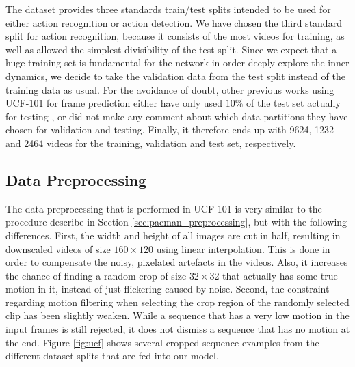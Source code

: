 The dataset provides three standards train/test splits intended to be used for either action recognition or action detection. We have chosen the third standard split for action recognition, because it consists of the most videos for training, as well as allowed the simplest divisibility of the test split. Since we expect that a huge training set is fundamental for the network in order deeply explore the inner dynamics, we decide to take the validation data from the test split instead of the training data as usual. For the avoidance of doubt, other previous works using UCF-101 for frame prediction either have only used $ 10\% $ of the test set actually for testing \parencite[p. 12]{deep_multiscale_video_pred}, or did not make any comment about which data partitions they have chosen for validation and testing. Finally, it therefore ends up with \num{9624}, \num{1232} and \num{2464} videos for the training, validation and test set, respectively.


\subsection{Data Preprocessing}

The data preprocessing that is performed in UCF-101 is very similar to the procedure describe in Section \ref{sec:pacman_preprocessing}, but with the following differences. First, the width and height of all images are cut in half, resulting in downscaled videos of size $160 \times 120$ using linear interpolation. This is done in order to compensate the noisy, pixelated artefacts in the videos. Also, it increases the chance of finding a random crop of size $ 32 \times 32 $ that actually has some true motion in it, instead of just flickering caused by noise. Second, the constraint regarding motion filtering when selecting the crop region of the randomly selected clip has been slightly weaken. While a sequence that has a very low motion in the input frames is still rejected, it does not dismiss a sequence that has no motion at the end. Figure \ref{fig:ucf} shows several cropped sequence examples from the different dataset splits that are fed into our model.

